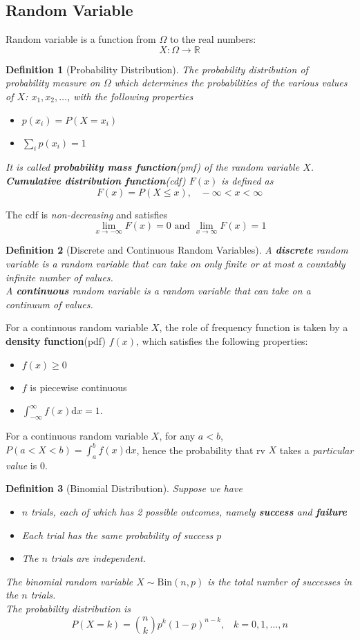 \documentclass[12pt]{article}
\newcommand{\diff}{\mathrm{d}}
\newcommand{\bin}{\mathrm{Bin}}
\newtheorem{definition}{Definition}[section]
\theoremstyle{definition}
\begin{document}
\subsection{Random Variable}
Random variable is a function from $\Omega$ to the real numbers:
\[
X: \Omega \to \mathbb{R}
\]
\begin{definition}[Probability Distribution]
\normalfont The probability distribution of probability measure on $\Omega$ which determines the probabilities of the various values of $X$: $x_1, x_2,\ldots$, with the following properties
\begin{itemize}
  \item $p(x_i)=P(X=x_i)$
  \item $\sum_{i} p(x_i)=1$
\end{itemize}
It is called \textbf{probability mass function}(pmf) of the random variable $X$.\\
\textbf{Cumulative distribution function}(cdf) $F(x)$ is defined as 
\[
F(x) = P(X\leq x), \;\;\;-\infty<x<\infty
\]
\end{definition}
The cdf is \textit{non-decreasing} and satisfies
\[
\lim_{x\to -\infty} F(x)=0\text{   and   }\lim_{x\to \infty} F(x)=1
\]
\begin{definition}[Discrete and Continuous Random Variables]
\normalfont A \textbf{discrete} random variable is a random variable that can take on only finite or at most a countably infinite number of values.\\
A \textbf{continuous} random variable is a random variable that can take on a continuum of values.
\end{definition}
For a continuous random variable $X$, the role of frequency function is taken by a \textbf{density function}(pdf) $f(x)$, which satisfies the following properties:
\begin{itemize}
  \item $f(x)\geq 0$
  \item $f$ is piecewise continuous
  \item $\int_{-\infty}^{\infty} f(x)\diff x=1$.
\end{itemize}
For a continuous random variable $X$, for any $a<b$, $P(a<X<b)=\int_a^b f(x)\diff x$, hence the probability that rv $X$ takes a \textit{particular value} is $0$.
\begin{definition}[Binomial Distribution]
\normalfont Suppose we have
\begin{itemize}
  \item $n$ trials, each of which has 2 possible outcomes, namely \textbf{success} and \textbf{failure}
  \item Each trial has the same probability of success $p$
  \item The $n$ trials are independent.
\end{itemize}
The binomial random variable $X\sim \bin(n,p)$ is the total number of successes in the $n$ trials. \\
The probability distribution is
\[
P(X=k)=\binom{n}{k} p^k(1-p)^{n-k},\;\;\;k=0,1,\ldots, n
\]
\end{definition}
\end{document}
